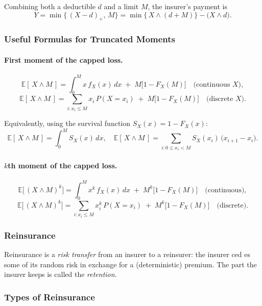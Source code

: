 \documentclass[11pt]{article}
\begin{document}
Combining both a deductible \(d\) and a limit \(M\), the insurer’s payment is
\[
  Y = \min\bigl\{\,(X-d)_{+},\,M\bigr\}
  = \min\bigl\{\,X \wedge (d+M)\bigr\} - \bigl(X \wedge d\bigr).
\]

\subsubsection{Useful Formulas for Truncated Moments}

\paragraph{First moment of the capped loss.}
\[
  \mathbb{E}[\,X \wedge M\,]
    = \int_{0}^{M} x\,f_X(x)\,dx \;+\; M\bigl[1 - F_X(M)\bigr]
    \quad\text{(continuous \(X\))},
\]
\[
  \mathbb{E}[\,X \wedge M\,]
    = \sum_{i: x_i\le M} x_i\,P(X=x_i)\;+\;M\bigl[1 - F_X(M)\bigr]
    \quad\text{(discrete \(X\))}.
\]

Equivalently, using the survival function \(S_X(x)=1 - F_X(x)\):
\[
  \mathbb{E}[\,X \wedge M\,]
    = \int_{0}^{M} S_X(x)\,dx,
    \quad
  \mathbb{E}[\,X \wedge M\,]
    = \sum_{i:0\le x_i < M} S_X(x_i)\,\bigl(x_{i+1}-x_i\bigr).
\]

\paragraph{\(k\)th moment of the capped loss.}
\[
  \mathbb{E}\bigl[\,(X \wedge M)^k\bigr]
    = \int_{0}^{M} x^k\,f_X(x)\,dx \;+\; M^k\bigl[1 - F_X(M)\bigr]
    \quad\text{(continuous)},
\]
\[
  \mathbb{E}\bigl[\,(X \wedge M)^k\bigr]
    = \sum_{i: x_i\le M} x_i^k\,P(X=x_i)\;+\;M^k\bigl[1 - F_X(M)\bigr]
    \quad\text{(discrete)}.
\]

\subsubsection{Reinsurance}
Reinsurance is a \emph{risk transfer} from an insurer to a reinsurer: the insurer ced es some of its random risk in exchange for a (deterministic) premium.  The part the insurer keeps is called the \emph{retention}.

\subsubsection{Types of Reinsurance}
\end{document}
